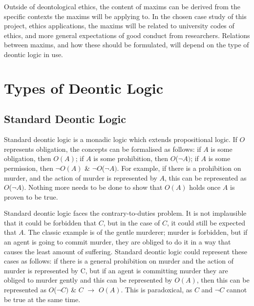 \documentclass{l4proj}
\begin{document}
Outside of deontological ethics, the content of maxims can be derived from the specific contexts the maxims will be applying to. In the chosen case study of this project, ethics applications, the maxims will be related to university codes of ethics, and more general expectations of good conduct from researchers. Relations between maxims, and how these should be formulated, will depend on the type of deontic logic in use. 


\section{Types of Deontic Logic}

\subsection{Standard Deontic Logic}
Standard deontic logic is a monadic logic which extends propositional logic. If $O$ represents obligation, the concepts can be formalised as follows: if $A$ is some obligation, then $O(A)$; if $A$ is some prohibition, then $O$(\( \neg \)$A)$; if $A$ is some permission, then \( \neg \)$O(A)$ \& \( \neg \)$O$(\( \neg \)$A)$. For example, if there is a prohibition on murder, and the action of murder is represented by $A$, this can be represented as $O$(\( \neg \)$A)$. Nothing more needs to be done to show that $O(A)$ holds once $A$ is proven to be true. 

Standard deontic logic faces the contrary-to-duties problem. It is not implausible that it could be forbidden that $C$, but in the case of $C$, it could still be expected that $A$. The classic example is of the gentle murderer; murder is forbidden, but if an agent is going to commit murder, they are obliged to do it in a way that causes the least amount of suffering. Standard deontic logic could represent these cases as follows: if there is a general prohibition on murder and the action of murder is represented by C, but if an agent is committing murder they are obliged to murder gently and this can be represented by $O(A)$, then this can be represented as $O$(\( \neg \)$C)$ \& $C$ \( \to \) $O(A)$. This is paradoxical, as $C$ and \( \neg \)$C$ cannot be true at the same time. 
\end{document}
